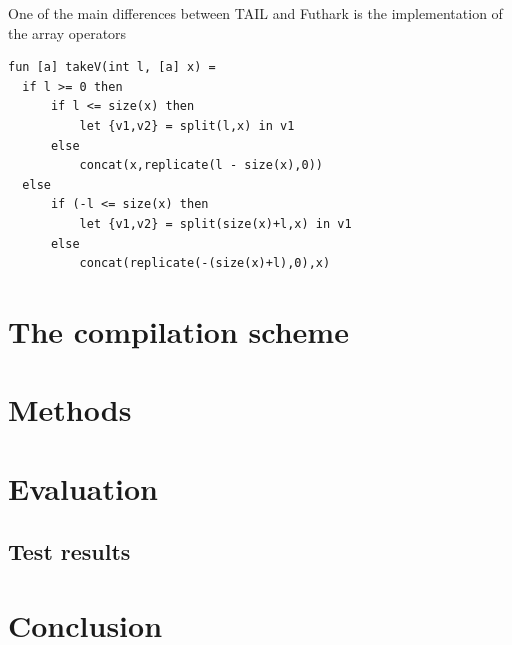 \documentclass[11pt]{article}
\begin{document}
One of the main differences between TAIL and Futhark is the implementation of the array operators 

\begin{lstlisting}
fun [a] takeV(int l, [a] x) =
  if l >= 0 then
      if l <= size(x) then
          let {v1,v2} = split(l,x) in v1
      else
          concat(x,replicate(l - size(x),0))
  else
      if (-l <= size(x) then
          let {v1,v2} = split(size(x)+l,x) in v1
      else
          concat(replicate(-(size(x)+l),0),x)
\end{lstlisting}

\section{The compilation scheme}
\section{Methods}
\section{Evaluation}
\subsection{Test results}
\section{Conclusion}



\end{document}
